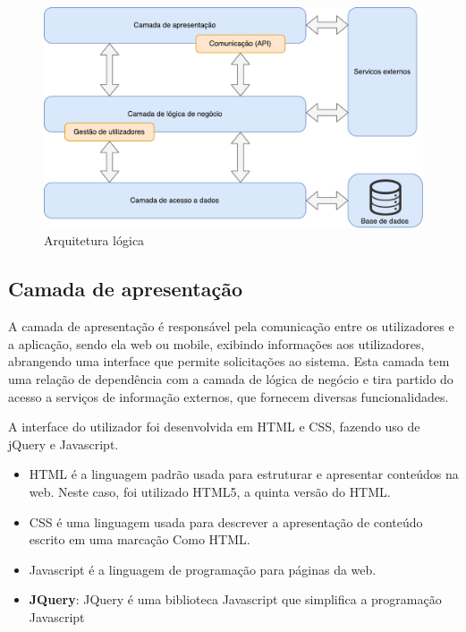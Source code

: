 \begin{figure}[!htb]
	\centering
	\includegraphics[scale = 0.6]{esquemas/arquitetura-logica.pdf}
	\caption{Arquitetura lógica}
	\label{opencvlogo}
\end{figure}



\subsection{Camada de apresentação}


A camada de apresentação é responsável pela comunicação entre os utilizadores e a aplicação, sendo ela web ou mobile, exibindo informações aos utilizadores, abrangendo uma interface que permite solicitações ao sistema. Esta camada tem uma relação de dependência com a camada de lógica de negócio e tira partido do acesso a serviços de informação externos, que fornecem diversas funcionalidades. 


A interface do utilizador foi desenvolvida em  \ac{HTML} e \acs{CSS}, fazendo uso de jQuery e Javascript.



\begin{itemize}
	\item \ac{HTML} é a linguagem padrão usada para estruturar e apresentar conteúdos na web. Neste caso, foi utilizado HTML5, a quinta versão do \ac{HTML}.
	\item \ac{CSS} é uma linguagem usada para descrever a apresentação de conteúdo escrito em uma marcação Como HTML.
	
	\item Javascript é a linguagem de programação para páginas da web.
	\item \textbf{JQuery}: JQuery é uma biblioteca Javascript que simplifica a programação Javascript
\end{itemize}









